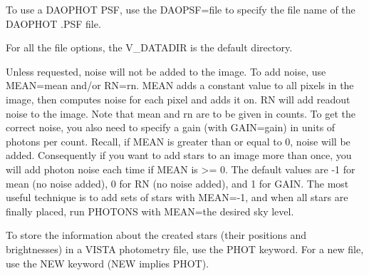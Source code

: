 To use a DAOPHOT PSF, use the DAOPSF=file to specify the file name of the
DAOPHOT .PSF file.

For all the file options, the V\_DATADIR is the default directory.

Unless requested, noise will not be added to the image. To add noise, use
MEAN=mean and/or RN=rn. MEAN adds a constant value to all pixels in the
image, then computes noise for each pixel and adds it on. RN will add
readout noise to the image. Note that mean and rn are to be given in
counts. To get the correct noise, you also need to specify a gain (with
GAIN=gain) in units of photons per count. Recall, if MEAN is greater than
or equal to 0, noise will be added. Consequently if you want to add stars
to an image more than once, you will add photon noise each time if MEAN
is >= 0.  The default values are -1 for mean (no noise added), 0 for RN (no
noise added), and 1 for GAIN. The most useful technique is to add sets of
stars with MEAN=-1, and when all stars are finally placed, run PHOTONS with
MEAN=the desired sky level.

To store the information about the created stars (their positions and
brightnesses) in a VISTA photometry file, use the PHOT keyword. For a new
file, use the NEW keyword (NEW implies PHOT).


